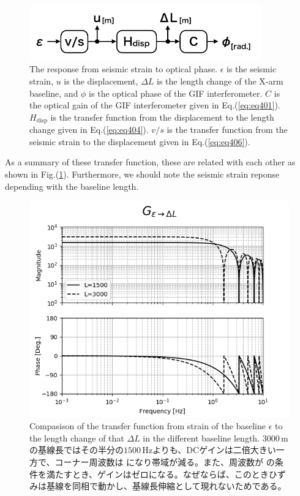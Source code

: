 \begin{figure}[h]
  \centering
  \includegraphics[width=10.0cm]{./img_chap4/img411.png}
  \caption{The response from seismic strain to optical phase. $\epsilon$ is the seismic strain, $u$ is the displacement, $\Delta{L}$ is the length change of the X-arm baseline, and $\phi$ is the optical phase of the GIF interferometer. $C$ is the optical gain of the GIF interferometer given in Eq.(\ref{eq:eq401}). $H_{\mathrm{disp}}$ is the transfer function from the displacement to the length change given in Eq.(\ref{eq:eq404}). $v/s$ is the transfer function from the seismic strain to the displacement given in Eq.(\ref{eq:eq406}). } \label{img:img411}
\end{figure}

As a summary of these transfer function, these are related with each other as shown in Fig.(\ref{img:img411}). Furthermore, we should note the seismic strain reponse depending with the baseline length.

\begin{figure}[p]
  \begin{center}
    \includegraphics[width=12.0cm]{./img_chap4/img412.png}
    \caption{Compasison of the transfer function from strain of the baseline $\epsilon$ to the length change of that $\Delta{L}$ in the different baseline length. $3000\,\mathrm{m}$ の基線長ではその半分の$1500\,\mathrm{Hz}$よりも、DCゲインは二倍大きい一方で、コーナー周波数は \color{red}{A} になり帯域が減る。また、周波数が \color{red}{B} の条件を満たすとき、ゲインはゼロになる。なぜならば、このときひずみは基線を同相で動かし、基線長伸縮として現れないためである。}
  \end{center}
\end{figure}



